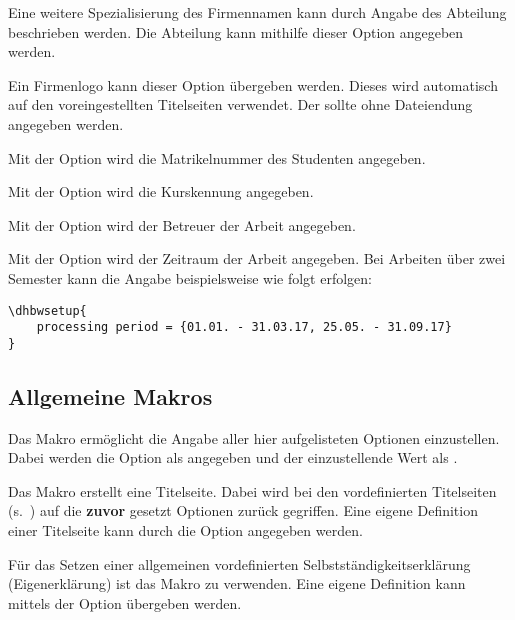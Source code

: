 \documentclass[babel=ngerman,highlight=false]{skdoc}
\begin{document}
            Eine weitere Spezialisierung des Firmennamen kann durch Angabe des Abteilung beschrieben werden. Die Abteilung kann mithilfe dieser Option angegeben werden.\medskip
            
            Ein Firmenlogo kann dieser Option übergeben werden. Dieses wird automatisch auf den voreingestellten Titelseiten verwendet. Der  sollte ohne Dateiendung angegeben werden.\medskip
            
            Mit der Option wird die Matrikelnummer des Studenten angegeben.\medskip
            
            Mit der Option wird die Kurskennung angegeben.\medskip
            
            Mit der Option wird der Betreuer der Arbeit angegeben.\medskip
            
            Mit der Option wird der Zeitraum der Arbeit angegeben. Bei Arbeiten über zwei Semester kann die Angabe beispielsweise wie folgt erfolgen:
            \begin{verbatim}
\dhbwsetup{
    processing period = {01.01. - 31.03.17, 25.05. - 31.09.17}
}
            \end{verbatim}
            
        \subsection{Allgemeine Makros}
            \DescribeMacro{} Das Makro ermöglicht die Angabe aller hier aufgelisteten Optionen einzustellen. Dabei werden die Option als  angegeben und der einzustellende Wert als .
            
            \DescribeMacro\dhbwtitlepage Das Makro erstellt eine Titelseite. Dabei wird bei den vordefinierten Titelseiten (s.~) auf die \textbf{zuvor} gesetzt Optionen zurück gegriffen. Eine eigene Definition einer Titelseite kann durch die Option  angegeben werden.
            
            \DescribeMacro\dhbwdeclaration Für das Setzen einer allgemeinen vordefinierten Selbstständigkeitserklärung (Eigenerklärung) ist das Makro zu verwenden. Eine eigene Definition kann mittels der Option  übergeben werden.
            
\end{document}
